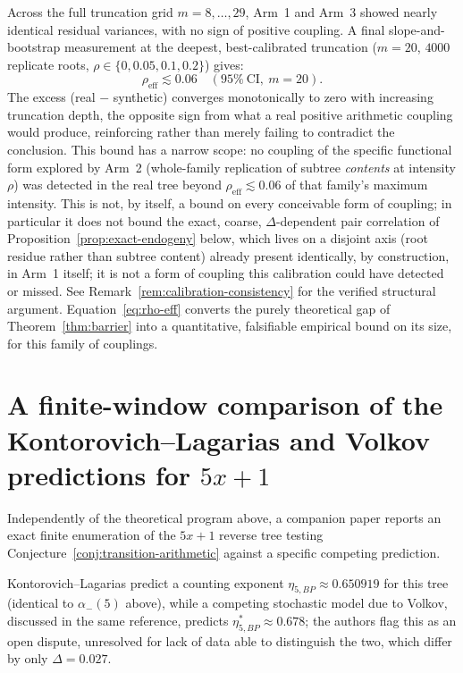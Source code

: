 \documentclass[11pt]{article}
\theoremstyle{definition}
\theoremstyle{remark}
\begin{document}
Across the full truncation grid $m=8,\dots,29$, Arm~1 and Arm~3 showed
nearly identical residual variances, with no sign of positive coupling.
A final slope-and-bootstrap measurement at the deepest, best-calibrated
truncation ($m=20$, $4000$ replicate roots, $\rho\in\{0,0.05,0.1,0.2\}$)
gives:
\begin{equation}\label{eq:rho-eff}
  \rho_{\mathrm{eff}} \lesssim 0.06 \quad (95\%\ \text{CI}, \ m=20).
\end{equation}
The excess (real $-$ synthetic) converges monotonically to zero with
increasing truncation depth, the opposite sign from what a real
positive arithmetic coupling would produce, reinforcing rather than
merely failing to contradict the conclusion. This bound has a narrow
scope: no coupling of the specific functional form
explored by Arm~2 (whole-family replication of subtree \emph{contents}
at intensity $\rho$) was detected in the real tree beyond
$\rho_{\mathrm{eff}}\lesssim0.06$ of that family's maximum intensity.
This is not, by itself, a bound on every conceivable form of coupling;
in particular it does not bound the exact, coarse, $\Delta$-dependent
pair correlation of Proposition~\ref{prop:exact-endogeny} below, which
lives on a disjoint axis (root residue rather than subtree content) already
present identically, by construction, in Arm~1 itself; it is not
a form of coupling this calibration could have detected or missed. See
Remark~\ref{rem:calibration-consistency} for the verified structural
argument. Equation~\eqref{eq:rho-eff}
converts the purely theoretical gap of Theorem~\ref{thm:barrier} into a
quantitative, falsifiable empirical bound on its size, for this family
of couplings.

\section{A finite-window comparison of the Kontorovich--Lagarias and
Volkov predictions for $5x+1$}
\label{sec:kl}

Independently of the theoretical program above, a companion paper
\cite{KLVolkovCompanion} reports an exact finite enumeration of the
$5x+1$ reverse tree testing Conjecture~\ref{conj:transition-arithmetic}
against a specific competing prediction.

Kontorovich--Lagarias \cite{KontorovichLagarias2009} predict a counting
exponent $\eta_{5,BP}\approx0.650919$ for this tree (identical to
$\alpha_-(5)$ above), while a competing stochastic model due to Volkov,
discussed in the same reference, predicts $\eta^\ast_{5,BP}\approx
0.678$; the authors flag this as an open dispute, unresolved for lack
of data able to distinguish the two, which differ by only
$\Delta=0.027$.
\end{document}
